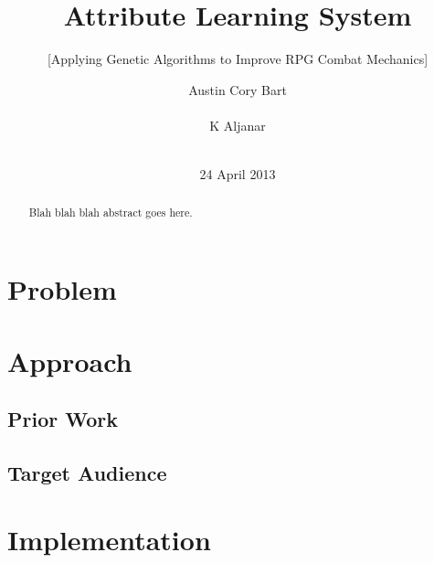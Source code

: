 \documentclass{acm_proc_article-sp}
\begin{document}
\title{Attribute Learning System}
\subtitle{[Applying Genetic Algorithms to Improve RPG Combat Mechanics]} %



\author{
\alignauthor
Austin Cory Bart\\
       \\
\alignauthor
K Aljanar\\
       \\
\alignauthor
}

\date{24 April 2013}

\maketitle
\begin{abstract}
Blah blah blah abstract goes here.
\end{abstract}




\section{Problem}
	
\section{Approach}

    \subsection{Prior Work}

    \subsection{Target Audience}

\section{Implementation}
\end{document}
